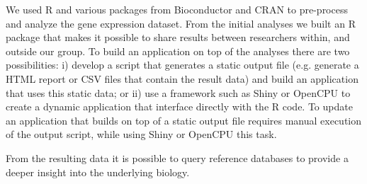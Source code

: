 We used R and various packages from Bioconductor and CRAN to pre-process and
analyze the gene expression dataset.  
From the initial analyses we built an R
package that makes it possible to share results between researchers within, and
outside our group. 
To build an application on top of the analyses there are two
possibilities: i) develop a script that generates a static output file (e.g.
generate a HTML report or CSV files that contain the result data) and build an
application that uses this static data; or ii) use a framework such as Shiny or
OpenCPU to create a dynamic application that interface directly with the R code.
To update an application that builds on top of a static output file requires
manual execution of the output script, while using Shiny or OpenCPU this task. 

From the resulting data it is possible to query reference databases to provide a
deeper insight into the underlying biology. 



